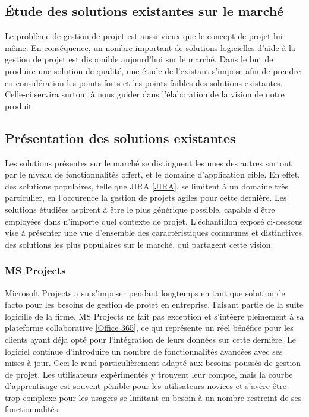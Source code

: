 \begin{spacing}{1.5}
\section{Étude des solutions existantes sur le marché}
Le problème de gestion de projet est aussi vieux que le concept de projet lui-même. En conséquence, un nombre important de solutions logicielles d'aide à la gestion de projet est disponible aujourd'hui sur le marché. Dans le but de produire une solution de qualité, une étude de l'existant s'impose afin de prendre en considération les points forts et les points faibles des solutions existantes. Celle-ci servira surtout à nous guider dans l'élaboration de la vision de notre produit.

\subsection{Présentation des solutions existantes}
Les solutions présentes sur le marché se distinguent les unes des autres surtout par le niveau de fonctionnalités offert, et le domaine d'application cible. En effet, des solutions populaires, telle que JIRA \ref{JIRA}, se limitent à un domaine très particulier, en l'occurence la gestion de projets agiles pour cette dernière. Les solutions étudiées aspirent à être le plus générique possible, capable d'être employées dans n'importe quel contexte de projet. L'échantillon exposé ci-dessous vise à présenter une vue d'ensemble des caractéristiques communes et distinctives des solutions les plus populaires sur le marché, qui partagent cette vision.

\subsubsection*{MS Projects} %
Microsoft Projects a su s'imposer pendant longtemps en tant que solution de facto pour les besoins de gestion de projet en entreprise. Faisant partie de la suite logicille de la firme, MS Projects ne fait pas exception et s'intègre pleinement à sa plateforme collaborative \ref{Office 365}, ce qui représente un réel bénéfice pour les clients ayant déja opté pour l'intégration de leurs données sur cette dernière. Le logiciel continue d'introduire un nombre de fonctionnalités avancées avec ses mises à jour. Ceci le rend particulièrement adapté aux besoins poussés de gestion de projet. Les utilisateurs expérimentés y trouvent leur compte, mais la courbe d'apprentisage est souvent pénible pour les utilisateurs novices et s'avère être trop complexe pour les usagers se limitant en besoin à un nombre restreint de ses fonctionnalités.


\end{spacing}
